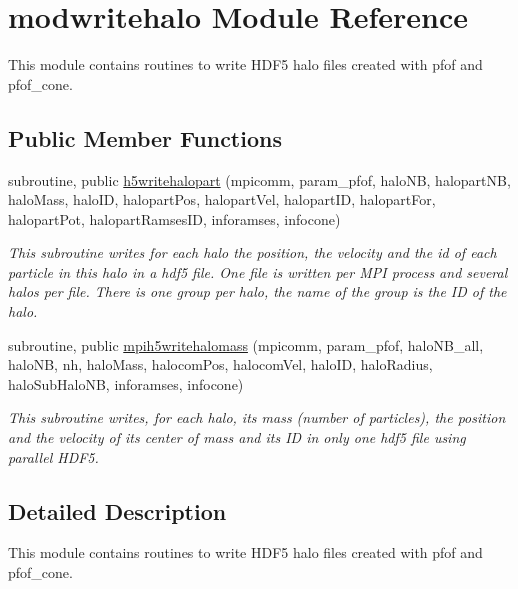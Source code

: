 \hypertarget{classmodwritehalo}{\section{modwritehalo Module Reference}
\label{classmodwritehalo}
}


This module contains routines to write H\-D\-F5 halo files created with pfof and pfof\-\_\-cone.  


\subsection*{Public Member Functions}
\begin{DoxyCompactItemize}
\item 
subroutine, public \hyperlink{classmodwritehalo_afd37f5189cf5f5ebe43de6b2c0959258}{h5writehalopart} (mpicomm, param\-\_\-pfof, halo\-N\-B, halopart\-N\-B, halo\-Mass, halo\-I\-D, halopart\-Pos, halopart\-Vel, halopart\-I\-D, halopart\-For, halopart\-Pot, halopart\-Ramses\-I\-D, inforamses, infocone)
\begin{DoxyCompactList}\small\item\em This subroutine writes for each halo the position, the velocity and the id of each particle in this halo in a hdf5 file. One file is written per M\-P\-I process and several halos per file. There is one group per halo, the name of the group is the I\-D of the halo. \end{DoxyCompactList}\item 
subroutine, public \hyperlink{classmodwritehalo_a4504dad75b760d800dd55e3cb9b90e71}{mpih5writehalomass} (mpicomm, param\-\_\-pfof, halo\-N\-B\-\_\-all, halo\-N\-B, nh, halo\-Mass, halocom\-Pos, halocom\-Vel, halo\-I\-D, halo\-Radius, halo\-Sub\-Halo\-N\-B, inforamses, infocone)
\begin{DoxyCompactList}\small\item\em This subroutine writes, for each halo, its mass (number of particles), the position and the velocity of its center of mass and its I\-D in only one hdf5 file using parallel H\-D\-F5. \end{DoxyCompactList}\end{DoxyCompactItemize}


\subsection{Detailed Description}
This module contains routines to write H\-D\-F5 halo files created with pfof and pfof\-\_\-cone. 

